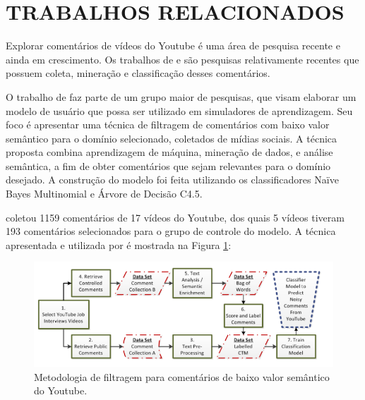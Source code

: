 \section{TRABALHOS RELACIONADOS}

Explorar comentários de vídeos do Youtube é uma área de pesquisa recente e ainda em crescimento. Os trabalhos de  e  são pesquisas relativamente recentes que possuem coleta, mineração e classificação desses comentários.

O trabalho de  faz parte de um grupo maior de pesquisas, que visam elaborar um modelo de usuário que possa ser utilizado em simuladores de aprendizagem. Seu foco é apresentar uma técnica de filtragem de comentários com baixo valor semântico para o domínio selecionado, coletados de mídias sociais. A técnica proposta combina aprendizagem de máquina, mineração de dados, e análise semântica, a fim de obter comentários que sejam relevantes para o domínio desejado. A construção do modelo foi feita utilizando os classificadores Naïve Bayes Multinomial e Árvore de Decisão C4.5.

 coletou 1159 comentários de 17 vídeos do Youtube, dos quais 5 vídeos tiveram 193 comentários selecionados para o grupo de controle do modelo. A técnica apresentada e utilizada por  é mostrada na Figura \ref{fig:ammari-metodologia}:

\begin{figure}[H] %
	\caption{\label{fig:ammari-metodologia} Metodologia de filtragem para comentários de baixo valor semântico do Youtube.}
	\begin{center}
	    \includegraphics[scale=0.8]{figuras/figura_3.PNG} %
	\end{center}
\end{figure}

